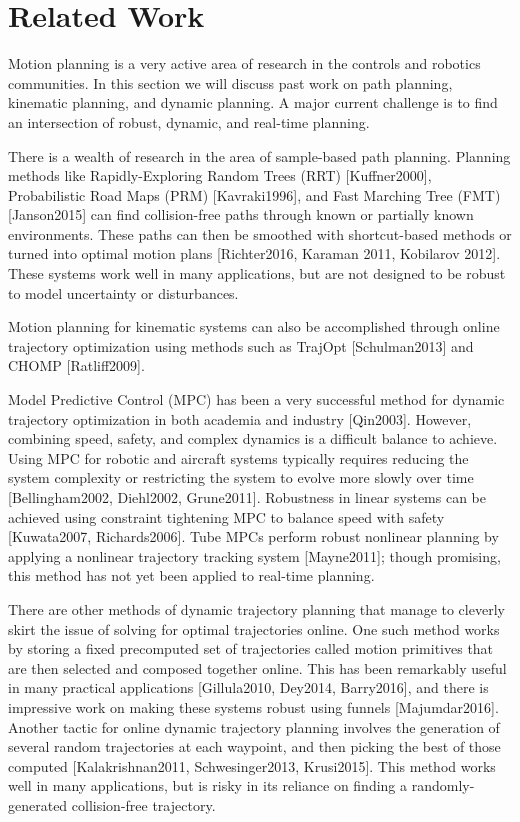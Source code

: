 \section{Related Work \label{sec:relatedwork}}
Motion planning is a very active area of research in the controls and robotics communities.  In this section we will discuss past work on path planning, kinematic planning, and dynamic planning.  A major current challenge is to find an intersection of robust, dynamic, and real-time planning. 

There is a wealth of research in the area of sample-based path planning.  Planning methods like Rapidly-Exploring Random Trees (RRT) [Kuffner2000], Probabilistic Road Maps (PRM) [Kavraki1996], and Fast Marching Tree (FMT) [Janson2015] can find collision-free paths through known or partially known environments. These paths can then be smoothed with shortcut-based methods or turned into optimal motion plans [Richter2016, Karaman 2011, Kobilarov 2012].  These systems work well in many applications, but are not designed to be robust to model uncertainty or disturbances.

Motion planning for kinematic systems can also be accomplished through online trajectory optimization using methods such as TrajOpt [Schulman2013] and CHOMP [Ratliff2009].  

Model Predictive Control (MPC) has been a very successful method for dynamic trajectory optimization in both academia and industry [Qin2003].  However, combining speed, safety, and complex dynamics is a difficult balance to achieve.  Using MPC for robotic and aircraft systems typically requires reducing the system complexity or restricting the system to evolve more slowly over time [Bellingham2002, Diehl2002, Grune2011].  Robustness in linear systems can be achieved using constraint tightening MPC to balance speed with safety [Kuwata2007, Richards2006]. Tube MPCs perform robust nonlinear planning by applying a nonlinear trajectory tracking system [Mayne2011]; though promising, this method has not yet been applied to real-time planning. 

There are other methods of dynamic trajectory planning that manage to cleverly skirt the issue of solving for optimal trajectories online.  One such method works by storing a fixed precomputed set of trajectories called motion primitives that are then selected and composed together online.  This has been remarkably useful in many practical applications [Gillula2010, Dey2014, Barry2016], and there is impressive work on making these systems robust using funnels [Majumdar2016].  Another tactic for online dynamic trajectory planning involves the generation of several random trajectories at each waypoint, and then picking the best of those computed [Kalakrishnan2011, Schwesinger2013, Krusi2015].  This method works well in many applications, but is risky in its reliance on finding a randomly-generated collision-free trajectory.  

